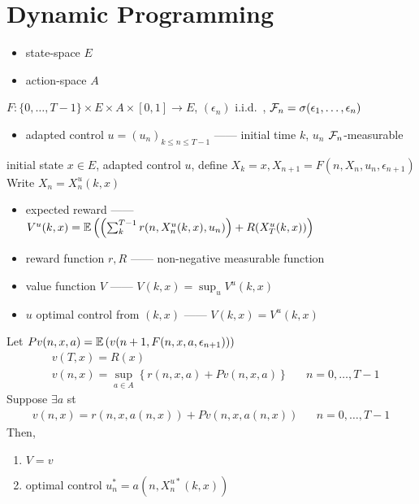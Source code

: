 \section{Dynamic Programming}\label{sec:dynamic-programming}

\begin{itemize}
    \item state-space $E$
    \item action-space $A$
\end{itemize}

\begin{setting}
    $F: \{0, \dots, T-1\}\times E \times A \times [0,1] \rightarrow E$, $(\epsilon_n)$ i.i.d.\ , $\mathcal{F}_n = \sigma(\epsilon_1, \dots, \epsilon_n)$
\end{setting}

\begin{itemize}
    \item adapted control $u = (u_n)_{k\leq n\leq T-1}$ ------ initial time $k$, $u_n$ $\mathcal{F}_n$-measurable
\end{itemize}

\begin{setting}
    initial state $x \in E$, adapted control $u$, define $X_k = x, X_{n+1} = F(n, X_n, u_n, \epsilon_{n+1})$ \\
    Write $X_n = X^u_n(k, x)$
\end{setting}

\begin{itemize}
    \item expected reward ------ $V^u(k, x) = \mathbb{E} \left( \left( \sum_k^{T-1} r(n , X_n^u(k, x), u_n)  \right)+ R(X_T^u(k, x)) \right)$
    \item reward function $r, R$ ------ non-negative measurable function
    \item value function $V$ ------ $V(k, x) = \sup_u V^u(k, x)$
    \item $u$ optimal control from $(k, x)$ ------ $V(k, x) = V^u(k, x)$
\end{itemize}

\begin{prop}
    Let $Pv(n, x, a) = \mathbb{E} \left( v(n + 1, F(n, x, a, \epsilon_{n+1})) \right)$
    \begin{align*}
        &v(T, x) = R(x) \\
        &v(n, x) = \sup_{a \in A} \left\{ r(n,x,a) + Pv(n, x, a)\right\} && n = 0, \dots, T-1
    \end{align*}
    Suppose $\exists a$ st
    \begin{align*}
        v(n, x) = r(n, x, a(n, x)) + Pv(n, x, a(n, x)) && n=0,\dots, T-1
    \end{align*}
    Then,
    \begin{enumerate}
        \item $V = v$
        \item optimal control $u_n^* = a(n, X_n^{u*}(k, x))$
    \end{enumerate}
\end{prop}

